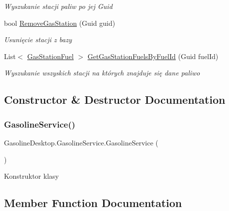 \begin{DoxyCompactItemize}
\begin{DoxyCompactList}\small\item\em Wyszukanie stacji paliw po jej Guid \end{DoxyCompactList}\item 
bool \mbox{\hyperlink{class_gasoline_desktop_1_1_gasoline_service_a613bb5610a147c3127af3a6214fb8648}{Remove\+Gas\+Station}} (Guid guid)
\begin{DoxyCompactList}\small\item\em Usunięcie stacji z bazy \end{DoxyCompactList}\item 
List$<$ \mbox{\hyperlink{class_gasoline_desktop_1_1_gas_station_fuel}{Gas\+Station\+Fuel}} $>$ \mbox{\hyperlink{class_gasoline_desktop_1_1_gasoline_service_ad3d04448aa5de9033059fa6b79caaa4d}{Get\+Gas\+Station\+Fuels\+By\+Fuel\+Id}} (Guid fuel\+Id)
\begin{DoxyCompactList}\small\item\em Wyszukanie wszyskich stacji na których znajduje się dane paliwo \end{DoxyCompactList}\end{DoxyCompactItemize}


\subsection{Constructor \& Destructor Documentation}
\mbox{\label{class_gasoline_desktop_1_1_gasoline_service_a86ac56afab474bdc68c4682f1bb50a32}} 
\subsubsection{\texorpdfstring{GasolineService()}{GasolineService()}}
{\footnotesize\ttfamily Gasoline\+Desktop.\+Gasoline\+Service.\+Gasoline\+Service (\begin{DoxyParamCaption}{ }\end{DoxyParamCaption})}



Konstruktor klasy 



\subsection{Member Function Documentation}
\mbox{\label{class_gasoline_desktop_1_1_gasoline_service_a896898680fc2723a823401d8d1213c06}} 
